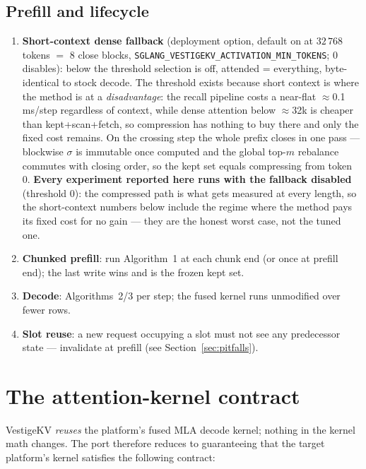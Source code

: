 \documentclass[11pt]{article}
\begin{document}
\subsection{Prefill and lifecycle}
\begin{enumerate}[itemsep=1pt]
\item \textbf{Short-context dense fallback} (deployment option, default on at
$32\,768$ tokens $=$ 8 close blocks, \texttt{SGLANG\_VESTIGEKV\_ACTIVATION\_MIN\_TOKENS};
$0$ disables): below the threshold selection is off, attended = everything,
byte-identical to stock decode. The threshold exists because short context is
where the method is at a \emph{disadvantage}: the recall pipeline costs a
near-flat $\approx$0.1\,ms/step regardless of context, while dense attention
below $\approx$32k is cheaper than kept+scan+fetch, so compression has
nothing to buy there and only the fixed cost remains. On the crossing step
the whole prefix closes in one pass --- blockwise $\sigma$ is immutable once
computed and the global top-$m$ rebalance commutes with closing order, so the
kept set equals compressing from token 0. \textbf{Every experiment reported
here runs with the fallback disabled} (threshold $0$): the compressed path is
what gets measured at every length, so the short-context numbers below
include the regime where the method pays its fixed cost for no gain --- they
are the honest worst case, not the tuned one.
\item \textbf{Chunked prefill}: run Algorithm~1 at each chunk end (or once at
prefill end); the last write wins and is the frozen kept set.
\item \textbf{Decode}: Algorithms~2/3 per step; the fused kernel runs
unmodified over fewer rows.
\item \textbf{Slot reuse}: a new request occupying a slot must not see any
predecessor state --- invalidate at prefill (see Section~\ref{sec:pitfalls}).
\end{enumerate}

\section{The attention-kernel contract}\label{sec:kernel}

VestigeKV \emph{reuses} the platform's fused MLA decode kernel; nothing in
the kernel math changes. The port therefore reduces to guaranteeing that the
target platform's kernel satisfies the following contract:
\end{document}
